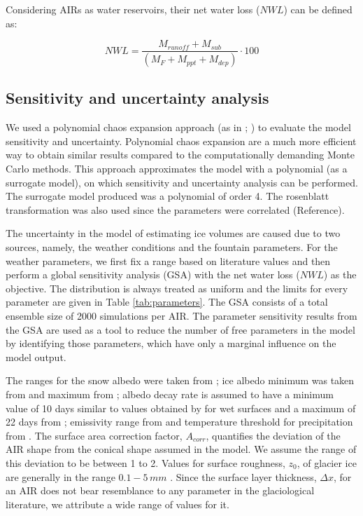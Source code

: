 \documentclass[utf8]{frontiersSCNS} %
\begin{document}
Considering AIRs as water reservoirs, their net water loss ($NWL$) can be defined as:

\begin{equation} \textit{NWL} = \frac{M_{runoff}+M_{sub}}{(M_F+M_{ppt}+M_{dep})} \cdot 100 \end{equation}

\subsection{Sensitivity and uncertainty analysis}

We used a polynomial chaos expansion approach (as in \cite{uncertainpy_2018}; \cite{Xiu_2005}) to evaluate the
model sensitivity and uncertainty. Polynomial chaos expansion are a much more efficient way to obtain similar
results compared to the computationally demanding Monte Carlo methods. This approach approximates the model with a
polynomial (as a surrogate model), on which sensitivity and uncertainty analysis can be performed.  The surrogate
model produced was a polynomial of order 4. The rosenblatt transformation was also used since the parameters were
correlated (Reference).

The uncertainty in the model of estimating ice volumes are caused due to two sources, namely, the weather
conditions and the fountain parameters. For the weather parameters, we first fix a range based on literature values
and then perform a global sensitivity analysis (GSA) with the net water loss ($NWL$) as the objective. The
distribution is always treated as uniform and the limits for every parameter are given in Table
\ref{tab:parameters}. The GSA consists of a total ensemble size of 2000 simulations per AIR. The parameter
sensitivity results from the GSA are used as a tool to reduce the number of free parameters in the model by
identifying those parameters, which have only a marginal influence on the model output.

The ranges for the snow albedo were taken from \cite{ZollesMaussion_2019}; ice albedo minimum was taken from
\cite{steiner_2015} and maximum from \cite{ZollesMaussion_2019}; albedo decay rate is assumed to have a minimum
value of 10 days similar to values obtained by \cite{Schmidt_2017} for wet surfaces and a maximum of 22 days from
\cite{OerlemansKnap_1998}; emissivity range from \cite{steiner_2015} and temperature threshold for precipitation
from \cite{Zhou_2010}. The surface area correction factor, $A_{corr}$, quantifies the deviation of the AIR shape
from the conical shape assumed in the model. We assume the range of this deviation to be between 1 to 2. Values for
surface roughness, $z_{0}$, of glacier ice are generally in the range $0.1-5\, mm$ \citep{BrockWillisSharp_2006}.
Since the surface layer thickness, $\Delta x$, for an AIR does not bear resemblance to any parameter in the
glaciological literature, we attribute a wide range of values for it.
\end{document}
